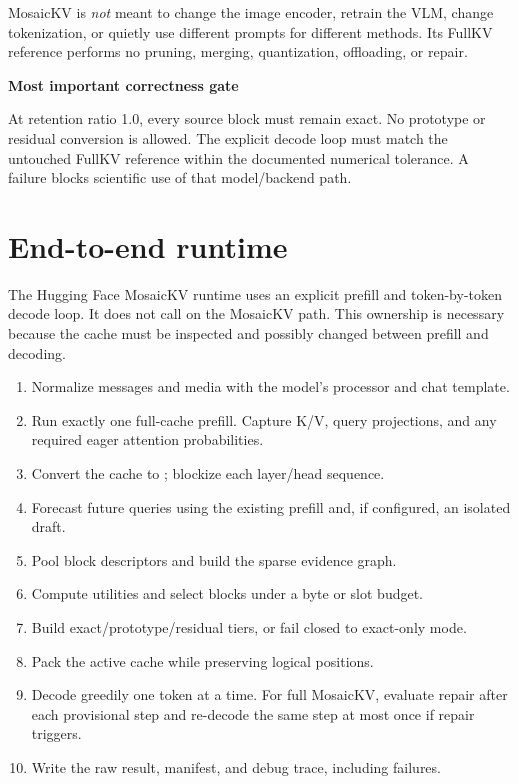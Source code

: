 \documentclass[11pt]{article}
\newcommand{\code}[1]{\texttt{\detokenize{#1}}}
\newenvironment{plainbox}[1]{%
  \begin{center}\begin{minipage}{0.94\linewidth}
  \colorbox{mklight}{\parbox{0.965\linewidth}{\textbf{#1}\par\smallskip}}
  \vspace{-0.5em}\small
}{%
  \end{minipage}\end{center}
}
\begin{document}
MosaicKV is \emph{not} meant to change the image encoder, retrain the VLM, change tokenization, or
quietly use different prompts for different methods. Its FullKV reference performs no pruning,
merging, quantization, offloading, or repair.

\begin{plainbox}{Most important correctness gate}
At retention ratio 1.0, every source block must remain exact. No prototype or residual conversion
is allowed. The explicit decode loop must match the untouched FullKV reference within the
documented numerical tolerance. A failure blocks scientific use of that model/backend path.
\end{plainbox}

\section{End-to-end runtime}
\label{sec:runtime}

The Hugging Face MosaicKV runtime uses an explicit prefill and token-by-token decode loop. It does
not call \code{model.generate()} on the MosaicKV path. This ownership is necessary because the
cache must be inspected and possibly changed between prefill and decoding.

\begin{enumerate}
  \item Normalize messages and media with the model's processor and chat template.
  \item Run exactly one full-cache prefill. Capture K/V, query projections, and any required eager
        attention probabilities.
  \item Convert the cache to \code{FullKVState}; blockize each layer/head sequence.
  \item Forecast future queries using the existing prefill and, if configured, an isolated draft.
  \item Pool block descriptors and build the sparse evidence graph.
  \item Compute utilities and select blocks under a byte or slot budget.
  \item Build exact/prototype/residual tiers, or fail closed to exact-only mode.
  \item Pack the active cache while preserving logical positions.
  \item Decode greedily one token at a time. For full MosaicKV, evaluate repair after each
        provisional step and re-decode the same step at most once if repair triggers.
  \item Write the raw result, manifest, and debug trace, including failures.
\end{enumerate}
\end{document}
